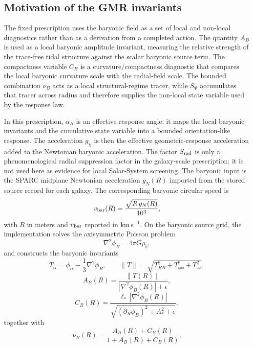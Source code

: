 ﻿\documentclass[twocolumn,linenumbers]{aastex701}
\begin{document}
\subsection{Motivation of the GMR invariants}

The fixed prescription uses the baryonic field as a set of local and non-local diagnostics rather than as a derivation from a completed action. The quantity $A_B$ is used as a local baryonic amplitude invariant, measuring the relative strength of the trace-free tidal structure against the scalar baryonic source term. The compactness variable $C_B$ is a curvature/compactness diagnostic that compares the local baryonic curvature scale with the radial-field scale. The bounded combination $\nu_B$ acts as a local structural-regime tracer, while $S_\Psi$ accumulates that tracer across radius and therefore supplies the non-local state variable used by the response law.

In this prescription, $\alpha_B$ is an effective response angle: it maps the local baryonic invariants and the cumulative state variable into a bounded orientation-like response. The acceleration $g_\chi$ is then the effective geometric-response acceleration added to the Newtonian baryonic acceleration. The factor $S_{\rm rad}$ is only a phenomenological radial suppression factor in the galaxy-scale prescription; it is not used here as evidence for local Solar-System screening. The baryonic input is the SPARC midplane Newtonian acceleration $g_N(R)$ imported from the stored source record for each galaxy. The corresponding baryonic circular speed is
\begin{equation}
v_{\rm bar}(R) = \frac{\sqrt{R\,g_N(R)}}{10^3},
\end{equation}
with $R$ in meters and $v_{\rm bar}$ reported in km\,s$^{-1}$. On the baryonic source grid, the implementation solves the axisymmetric Poisson problem
\begin{equation}
\nabla^2 \phi_B = 4\pi G\rho_b,
\end{equation}
and constructs the baryonic invariants
\begin{equation}
T_{ii} = \phi_{ii} - \frac{1}{3}\nabla^2\phi_B,
\qquad
\|T\| = \sqrt{T_{RR}^2 + T_{\phi\phi}^2 + T_{zz}^2},
\end{equation}
\begin{equation}
A_B(R) = \frac{\|T(R)\|}{|\nabla^2\phi_B(R)| + \epsilon},
\end{equation}
\begin{equation}
C_B(R) = \frac{\ell_*\,|\nabla^2\phi_B(R)|}{\sqrt{(\partial_R \phi_B)^2 + A_*^2 + \epsilon}},
\end{equation}
together with
\begin{equation}
\nu_B(R) = \frac{A_B(R) + C_B(R)}{1 + A_B(R) + C_B(R)}.
\end{equation}
\end{document}
